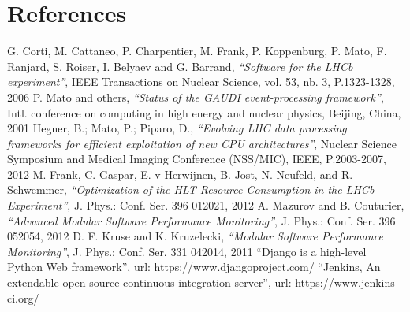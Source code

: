 \documentclass[a4paper]{jpconf}
\begin{document}
\section*{References}

\begin{thebibliography}{9}
 G. Corti, M. Cattaneo, P. Charpentier, M. Frank, P. Koppenburg, P. Mato, F. Ranjard, S. Roiser, I. Belyaev and G. Barrand, {\it ``Software for the LHCb experiment''}, IEEE Transactions on Nuclear Science, vol. 53, nb. 3, P.1323-1328, 2006
 P. Mato and others, {\it ``Status of the GAUDI event-processing framework''}, Intl. conference on computing in high energy and nuclear physics, Beijing, China, 2001
 Hegner, B.; Mato, P.; Piparo, D., {\it ``Evolving LHC data processing frameworks for efficient exploitation of new CPU architectures''}, Nuclear Science Symposium and Medical Imaging Conference (NSS/MIC), IEEE, P.2003-2007, 2012
M. Frank, C. Gaspar, E. v Herwijnen, B. Jost, N. Neufeld, and R. Schwemmer, {\it ``Optimization of the HLT Resource Consumption in the LHCb Experiment''}, J. Phys.: Conf. Ser. 396 012021, 2012
 A. Mazurov and B. Couturier, {\it ``Advanced Modular Software Performance Monitoring''}, J. Phys.: Conf. Ser. 396 052054, 2012
 D. F. Kruse and K. Kruzelecki, {\it ``Modular Software Performance Monitoring''}, J. Phys.: Conf. Ser. 331 042014, 2011
 ``Django is a high-level Python Web framework'', url: https://www.djangoproject.com/
 ``Jenkins, An extendable open source continuous integration server'', url: https://www.jenkins-ci.org/
\end{thebibliography}
\end{document}
